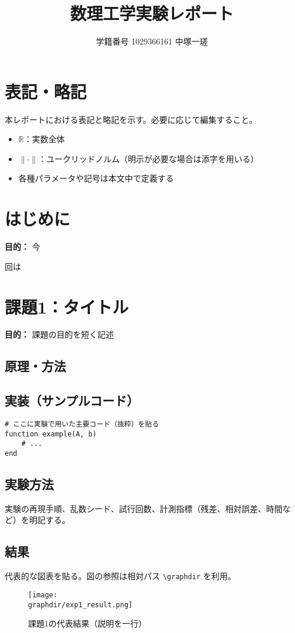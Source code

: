 \documentclass[a4paper,11pt]{ltjsarticle}
\title{数理工学実験レポート\\[4pt]\large \ChapterTitle}
\author{学籍番号 1029366161 \quad 中塚一瑳}
\date{\ExperimentDate}
\newcommand{\graphdir}{graphs}
\newcommand{\R}{\mathbb{R}}
\newcommand{\ExperimentHeader}[2]{%
  \section{#1}%
  \textbf{目的：} #2\par\vspace{6pt}%
}
\begin{document}
\maketitle
\begin{abstract}
\end{abstract}

\tableofcontents
\clearpage

\section*{表記・略記}
本レポートにおける表記と略記を示す。必要に応じて編集すること。
\begin{itemize}
  \item $\R$：実数全体
  \item $\|\cdot\|$：ユークリッドノルム（明示が必要な場合は添字を用いる）
  \item 各種パラメータや記号は本文中で定義する
\end{itemize}

\ExperimentHeader{はじめに}
今回は
\ExperimentHeader{課題1：タイトル}{課題の目的を短く記述}
\subsection{原理・方法}
\subsection{実装（サンプルコード）}
\begin{lstlisting}
# ここに実験で用いた主要コード（抜粋）を貼る
function example(A, b)
    # ...
end
\end{lstlisting}

\subsection{実験方法}
実験の再現手順、乱数シード、試行回数、計測指標（残差、相対誤差、時間など）を明記する。

\subsection{結果}
代表的な図表を貼る。図の参照は相対パス \verb|\graphdir| を利用。
\begin{figure}[H]
  \centering
  \texttt{[image: \\graphdir/exp1\_result.png]}
  \caption{課題1の代表結果（説明を一行）}
  \label{fig:exp1_result}
\end{figure}
\end{document}
